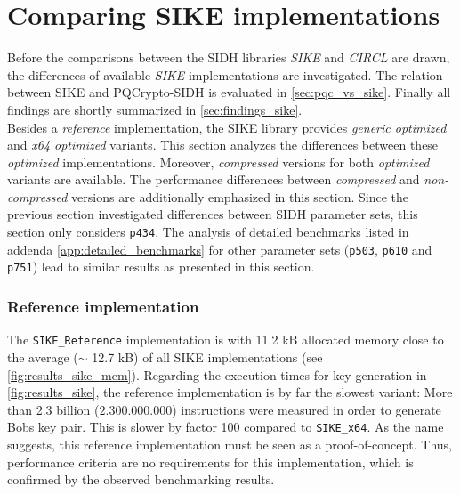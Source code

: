 \section{Comparing \gls{SIKE} implementations}\label{sec:analysis_sike}
Before the comparisons between the \gls{SIDH} libraries \textit{\gls{SIKE}} and \textit{\gls{CIRCL}} are drawn, the differences of available \textit{\gls{SIKE}} implementations are investigated. The relation between \gls{SIKE} and \gls{PQCrypto-SIDH} is evaluated in \autoref{sec:pqc_vs_sike}. Finally all findings are shortly summarized in \autoref{sec:findings_sike}.
\\
Besides a \textit{reference} implementation, the \gls{SIKE} library provides \textit{generic optimized} and \textit{x64 optimized} variants. This section analyzes the differences between these \textit{optimized} implementations. Moreover,  \textit{compressed} versions for both \textit{optimized} variants are available. The performance differences between \textit{compressed} and \textit{non-compressed} versions are additionally emphasized in this section. Since the previous section investigated differences between \gls{SIDH} parameter sets, this section only considers \texttt{p434}. The analysis of detailed benchmarks listed in addenda \ref{app:detailed_benchmarks} for other parameter sets (\texttt{p503}, \texttt{p610} and \texttt{p751}) lead to similar results as presented in this section.

\subsubsection{Reference implementation}
The \texttt{SIKE\_Reference} implementation is with 11.2 \gls{kB} allocated memory close to the average ($\sim$ 12.7 \gls{kB}) of all \gls{SIKE} implementations (see \autoref{fig:results_sike_mem}). Regarding the execution times for key generation in \autoref{fig:results_sike}, the reference implementation is by far the slowest variant: More than 2.3 billion ($2.300.000.000$) instructions were measured in order to generate Bobs key pair. This is slower by factor 100 compared to \texttt{SIKE\_x64}. As the name suggests, this reference implementation must be seen as a proof-of-concept. Thus, performance criteria are no requirements for this implementation, which is confirmed by the observed benchmarking results.

